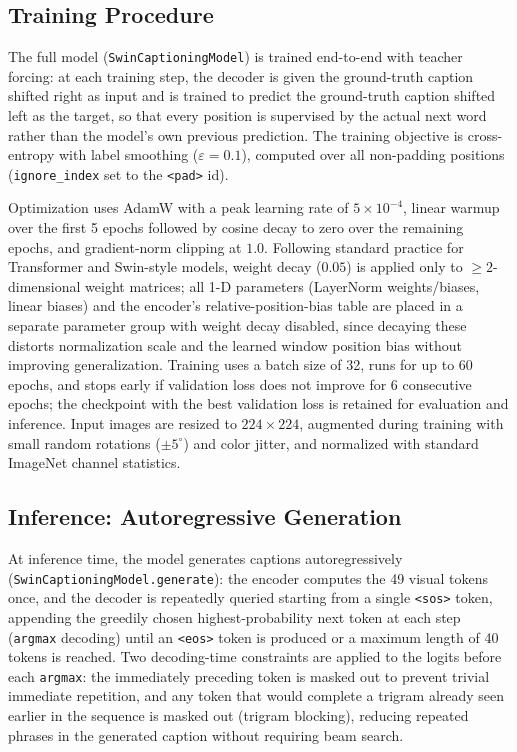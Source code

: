 \subsection{Training Procedure}
\label{sec:method-training}

The full model (\texttt{SwinCaptioningModel}) is trained end-to-end with teacher forcing: at each training step, the decoder is given the ground-truth caption shifted right as input and is trained to predict the ground-truth caption shifted left as the target, so that every position is supervised by the actual next word rather than the model's own previous prediction. The training objective is cross-entropy with label smoothing ($\varepsilon=0.1$), computed over all non-padding positions (\texttt{ignore\_index} set to the \texttt{<pad>} id).

Optimization uses AdamW with a peak learning rate of $5\times10^{-4}$, linear warmup over the first 5 epochs followed by cosine decay to zero over the remaining epochs, and gradient-norm clipping at $1.0$. Following standard practice for Transformer and Swin-style models, weight decay ($0.05$) is applied only to $\ge 2$-dimensional weight matrices; all 1-D parameters (LayerNorm weights/biases, linear biases) and the encoder's relative-position-bias table are placed in a separate parameter group with weight decay disabled, since decaying these distorts normalization scale and the learned window position bias without improving generalization. Training uses a batch size of 32, runs for up to 60 epochs, and stops early if validation loss does not improve for 6 consecutive epochs; the checkpoint with the best validation loss is retained for evaluation and inference. Input images are resized to $224\times224$, augmented during training with small random rotations ($\pm5^{\circ}$) and color jitter, and normalized with standard ImageNet channel statistics.

\subsection{Inference: Autoregressive Generation}
\label{sec:method-inference}

At inference time, the model generates captions autoregressively (\texttt{SwinCaptioningModel.generate}): the encoder computes the 49 visual tokens once, and the decoder is repeatedly queried starting from a single \texttt{<sos>} token, appending the greedily chosen highest-probability next token at each step (\texttt{argmax} decoding) until an \texttt{<eos>} token is produced or a maximum length of 40 tokens is reached. Two decoding-time constraints are applied to the logits before each \texttt{argmax}: the immediately preceding token is masked out to prevent trivial immediate repetition, and any token that would complete a trigram already seen earlier in the sequence is masked out (trigram blocking), reducing repeated phrases in the generated caption without requiring beam search.
